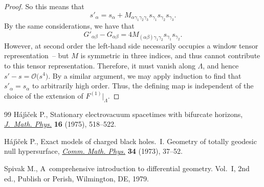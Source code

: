\documentclass[11pt]{article}
\numberwithin{equation}{section}
\renewcommand{\=}{\stackrel \Lambda =}
\begin{document}
\begin{proof}
So this means that
\[
s'_{\alpha} = s_{\alpha} + M_{\alpha \gamma_1 \gamma_2 \gamma_3} s_{\gamma_1} s_{\gamma_2} s_{\gamma_3} .
\]
By the same considerations, we have that
\[
G'_{\alpha \beta} - G_{\alpha \beta} = 4 M_{(\alpha \beta) \gamma_1 \gamma_2} s_{\gamma_1} s_{\gamma_2} .
\]
However, at second order the left-hand side necessarily occupies a window tensor representation~-- but $M$ is symmetric in three indices, and thus cannot contribute to this tensor representation. Therefore, it must vanish along $\Lambda$, and hence $s' - s = \mathcal{O}\bigl(s^4\bigr)$. By a similar argument, we may apply induction to find that $s'_{\alpha} = s_{\alpha}$ to arbitrarily high order. Thus, the defining map is independent of the choice of the extension of $F^{(1)}|_{\Lambda}$.
\end{proof}
\begin{thebibliography}{99}
H\'aj{\'\i}{\v{c}}ek P., Stationary electrovacuum spacetimes with bifurcate
 horizons, \href{https://doi.org/10.1063/1.522575}{\textit{J.~Math. Phys.}} \textbf{16} (1975), 518--522.

H\'aj\'{\i}\v{c}ek P., Exact models of charged black holes.~{I}. {G}eometry of
 totally geodesic null hypersurface, \href{https://doi.org/10.1007/BF01646541}{\textit{Comm. Math. Phys.}} \textbf{34}
 (1973), 37--52.

Spivak M., A~comprehensive introduction to differential geometry. {V}ol.~{I},
 2nd ed., Publish or Perish, Wilmington, DE, 1979.

\end{thebibliography}
\end{document}

